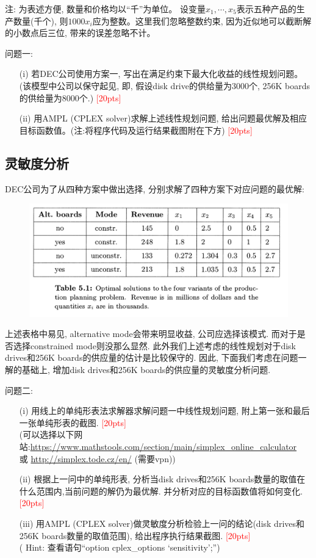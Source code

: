 \documentclass[10pt]{article}
\begin{document}
注: 为表述方便, 数量和价格均以``千''为单位。 设变量$x_1, \cdots, x_5$表示五种产品的生产数量(千个), 则$1000 x_i$应为整数。这里我们忽略整数约束, 因为近似地可以截断解的小数点后三位, 带来的误差忽略不计。

{\color{blue}问题一: 
	\begin{itemize}
		\item[(i)] 若DEC公司使用方案一, 写出在满足约束下最大化收益的线性规划问题。(该模型中公司以保守起见, 即, 假设disk drive的供给量为3000个, 256K boards的供给量为8000个.) \textcolor{red}{[20pts]}
		\item[(ii)] 用AMPL (CPLEX solver)求解上述线性规划问题, 给出问题最优解及相应目标函数值。(注:将程序代码及运行结果截图附在下方) \textcolor{red}{[20pts]}
	\end{itemize}
	 }

\subsection*{灵敏度分析}
DEC公司为了从四种方案中做出选择, 分别求解了四种方案下对应问题的最优解:
\begin{figure}[H]
	\centering
	\includegraphics[width=0.7\linewidth]{HW5_2.png}
	\label{fig.prob2}
\end{figure}
上述表格中易见, alternative mode会带来明显收益, 公司应选择该模式. 而对于是否选择constrained mode则没那么显然. 此外我们上述考虑的线性规划对于disk drives和256K boards的供应量的估计是比较保守的. 因此, 下面我们考虑在问题一解的基础上, 增加disk drives和256K boards的供应量的灵敏度分析问题.

{\color{blue}问题二: 
	\begin{itemize}
		\item[(i)] 用线上的单纯形表法求解器求解问题一中线性规划问题, 附上第一张和最后一张单纯形表的截图. \textcolor{red}{[20pts]}\\
		(可以选择以下网站:\url{https://www.mathstools.com/section/main/simplex_online_calculator}\\
		或 \url{http://simplex.tode.cz/en/} (需要vpn)) 
		\item[(ii)] 根据上一问中的单纯形表, 分析当disk drives和256K boards数量的取值在什么范围内,当前问题的解仍为最优解. 并分析对应的目标函数值将如何变化. \textcolor{red}{[20pts]}
		\item[(iii)] 用AMPL (CPLEX solver)做灵敏度分析检验上一问的结论(disk drives和256K boards数量的取值范围), 给出程序执行结果截图. \textcolor{red}{[20pts]}\\
					( Hint: 查看语句``option cplex\_options `sensitivity';'')
	\end{itemize}
}
\end{document}
